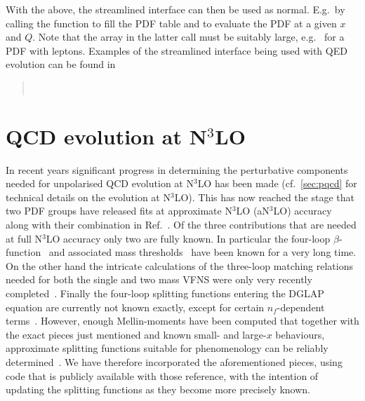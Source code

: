With the above, the streamlined interface can then be used as normal.
%
E.g.\ by calling the  function to fill the PDF
table and  to evaluate the PDF at a given $x$
and $Q$.
%
Note that the  array in the latter call must be
suitably large, e.g.\  for a PDF with leptons.
%
Examples of the streamlined interface being used with QED evolution
can be found in
\begin{quote}
  \\
\end{quote}

\section{QCD evolution at N$^3$LO}
\label{sec:n3lo-evolution}
In recent years significant progress in determining the perturbative
components needed for unpolarised QCD evolution at N$^3$LO has been
made (cf.\ \ref{sec:pqcd} for technical details on the evolution at
N$^3$LO).
%
This has now reached the stage that two PDF groups have released fits
at approximate N$^3$LO (aN$^3$LO)
accuracy~\cite{McGowan:2022nag,NNPDF:2024nan} along with their
combination in Ref.~\cite{Cridge:2024icl}.
%
Of the three contributions that are needed at full N$^3$LO accuracy
only two are fully known.
%
In particular the four-loop
$\beta$-function~\cite{vanRitbergen:1997va,Czakon:2004bu} and
associated mass thresholds~\cite{Chetyrkin:1997sg} have been known for
a very long time.
%
On the other hand the intricate calculations of the three-loop
matching relations needed for both the single and two mass VFNS were
only very recently
completed~\cite{Bierenbaum:2009mv,Ablinger:2010ty,Kawamura:2012cr,Blumlein:2012vq,ABLINGER2014263,Ablinger:2014nga,Ablinger:2014vwa,Behring:2014eya,Ablinger:2019etw,Behring:2021asx,Ablinger:2023ahe,Ablinger:2024xtt}.
%
Finally the four-loop splitting functions entering the DGLAP equation
are currently not known exactly, except for certain $n_f$-dependent
terms~\cite{Gracey:1994nn,Davies:2016jie,Moch:2017uml,Gehrmann:2023cqm,Falcioni:2023tzp,Gehrmann:2023iah}.
%
However, enough Mellin-moments have been computed that together with
the exact pieces just mentioned and known small- and large-$x$
behaviours, approximate splitting functions suitable for phenomenology
can be reliably
determined~\cite{McGowan:2022nag,NNPDF:2024nan,Moch:2021qrk,Falcioni:2023luc,Falcioni:2023vqq,Moch:2023tdj,Falcioni:2024xyt,Falcioni:2024qpd}.
%
We have therefore incorporated the aforementioned pieces, using code
that is publicly available with those reference, with the intention of
updating the splitting functions as they become more precisely known.

